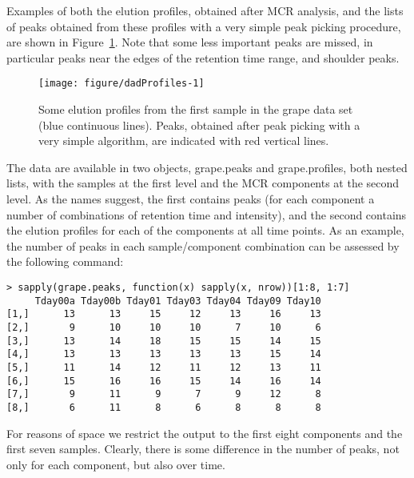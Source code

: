 \documentclass[a4paper,11pt]{article}\usepackage[]{graphicx}\usepackage[]{color}
\makeatletter
\newenvironment{kframe}{%
 \def\at@end@of@kframe{}%
 \ifinner\ifhmode%
  \def\at@end@of@kframe{\end{minipage}}%
  \begin{minipage}{\columnwidth}%
 \fi\fi%
 \def\FrameCommand##1{\hskip\@totalleftmargin \hskip-\fboxsep
 \colorbox{shadecolor}{##1}\hskip-\fboxsep
     \hskip-\linewidth \hskip-\@totalleftmargin \hskip\columnwidth}%
 \MakeFramed {\advance\hsize-\width
   \@totalleftmargin\z@ \linewidth\hsize
   \@setminipage}}%
 {\par\unskip\endMakeFramed%
 \at@end@of@kframe}
\newenvironment{knitrout}{}{} %
\newcommand{\code}[1]{{\ttfamily #1}}
\makeatother
\begin{document}
\noindent
Examples of
both the elution profiles, obtained after MCR analysis, and the lists
of peaks obtained from these profiles with a very simple peak picking
procedure, are shown in Figure~\ref{fig:dadProfiles}. Note that some
less important peaks are missed, in particular peaks near the edges of
the retention time range, and shoulder peaks.

\begin{figure}[tb]
\centering
\begin{knitrout}\small
{}\color{fgcolor}
\texttt{[image: figure/dadProfiles-1]} 
\end{knitrout}
\caption{Some elution profiles from the first sample in the grape data set
  (blue continuous lines). Peaks, obtained after peak picking with a
  very simple algorithm, are indicated with red vertical lines.}
\label{fig:dadProfiles}
\end{figure}

The data are available in two objects, \code{grape.peaks} and
\code{grape.profiles}, both
nested lists, with the samples at the first level and the MCR
components at the second level. As the names suggest, the first
contains peaks (for each component a number of combinations of
retention time and intensity), and the second contains the elution
profiles for each of the components at all time points. As an example, 
the number of peaks in each sample/component combination can be assessed
by the following command:

\begin{knitrout}\small
{}\color{fgcolor}\begin{kframe}
\begin{verbatim}
> sapply(grape.peaks, function(x) sapply(x, nrow))[1:8, 1:7]
     Tday00a Tday00b Tday01 Tday03 Tday04 Tday09 Tday10
[1,]      13      13     15     12     13     16     13
[2,]       9      10     10     10      7     10      6
[3,]      13      14     18     15     15     14     15
[4,]      13      13     13     13     13     15     14
[5,]      11      14     12     11     12     13     11
[6,]      15      16     16     15     14     16     14
[7,]       9      11      9      7      9     12      8
[8,]       6      11      8      6      8      8      8
\end{verbatim}
\end{kframe}
\end{knitrout}

\noindent
For reasons of space we restrict the output to the first eight
components and the first seven samples. Clearly, there is some 
difference in the number of peaks, not only for each component, but
also over time.
\end{document}
